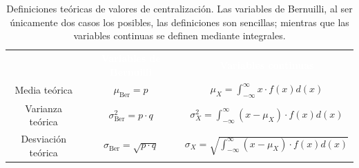 \begin{table}[H]
    \begin{tabular}{ccc}
        \rowcolor{black}&\textcolor{white}{\textbf{Variables de Bernuilli}}&\textcolor{white}{\textbf{Variables continuas}}\\
        Media teórica&$\mu_{\mbox{Ber}} = p$&$\mu_X = \int_{-\infty}^{\infty}x\cdot f\left( x\right) d\left( x\right) $\\
        \rowcolor{hiperlightgray}Varianza teórica&$\sigma_{\mbox{Ber}}^2 = p\cdot q$&$\sigma_X^2 = \int_{-\infty}^{\infty}\left( x -\mu_X\right) \cdot f\left( x\right) d\left( x\right) $\\
        Desviación teórica&$\sigma_{\mbox{Ber}} = \sqrt{p\cdot q}$&$\sigma_X =\sqrt{\int_{-\infty}^{\infty}\left( x -\mu_X\right) \cdot f\left( x\right) d\left( x\right)}$\\
        \hline
    \end{tabular}
    \caption[Definiciones teóricas de valores de centralización]{Definiciones teóricas de valores de centralización. Las variables de Bernuilli, al ser únicamente dos casos los posibles, las definiciones son sencillas; mientras que las variables continuas se definen mediante integrales.}
\end{table}
